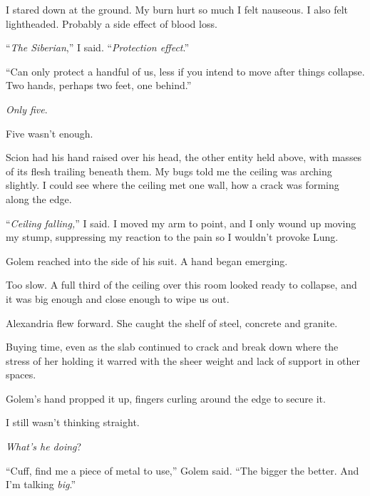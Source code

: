 I stared down at the ground.  My burn hurt so much I felt nauseous.  I also felt lightheaded.  Probably a side effect of blood loss.



``\emph{The Siberian},'' I said.  ``\emph{Protection effect}.''



``Can only protect a handful of us, less if you intend to move after things collapse.  Two hands, perhaps two feet, one behind.''



\emph{Only five}.



Five wasn't enough.



Scion had his hand raised over his head, the other entity held above, with masses of its flesh trailing beneath them.  My bugs told me the ceiling was arching slightly.  I could see where the ceiling met one wall, how a crack was forming along the edge.



``\emph{Ceiling falling,}'' I said.  I moved my arm to point, and I only wound up moving my stump, suppressing my reaction to the pain so I wouldn't provoke Lung.



Golem reached into the side of his suit.  A hand began emerging.



Too slow.  A full third of the ceiling over this room looked ready to collapse, and it was big enough and close enough to wipe us out.



Alexandria flew forward.  She caught the shelf of steel, concrete and granite.



Buying time, even as the slab continued to crack and break down where the stress of her holding it warred with the sheer weight and lack of support in other spaces.



Golem's hand propped it up, fingers curling around the edge to secure it.



I still wasn't thinking straight.



\emph{What's he doing}?



``Cuff, find me a piece of metal to use,'' Golem said.  ``The bigger the better.  And I'm talking \emph{big}.''



